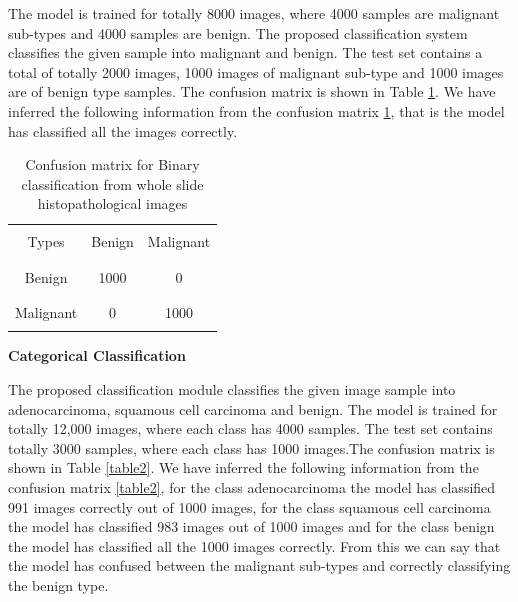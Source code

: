 \documentclass[conference]{IEEEtran}
\begin{document}
The model is trained for totally 8000 images, where 4000 samples are malignant sub-types and 4000 samples are benign. The proposed classification system classifies the given sample into malignant and benign. The test set contains a total of totally 2000 images, 1000 images of malignant sub-type and 1000 images are of benign type samples. The confusion matrix is shown in Table \ref{table1}. We have inferred the following information from the confusion matrix \ref{table1}, that is the model has classified all the images correctly.
\begin{table}
\begin{center}
\begin{tabular}[scale=2.0]{ | c |c  |c  | }
  \hline        
  &  &\\
  Types  & Benign & Malignant  \\
  & & \\
   \hline
   &  & \\
  Benign & 1000  &  0   \\ 
  & & \\
  \hline
  &  & \\
  Malignant  & 0 &    1000   \\
  & & \\
  \hline  
\end{tabular}
\caption{Confusion matrix for Binary classification from whole slide histopathological images}
\label{table1}
\end{center}
\end{table}
\newpage






\textbf{Categorical Classification}
%


The proposed classification module classifies the given image sample into adenocarcinoma, squamous cell carcinoma and benign. The model is trained for totally 12,000 images, where each class has 4000 samples. The test set contains totally 3000 samples, where each class has 1000 images.The confusion matrix is shown in Table \ref{table2}. We have inferred the following information from the confusion matrix \ref{table2}, for the class adenocarcinoma the model has classified 991 images correctly out of 1000 images, for the class squamous cell carcinoma the model has classified 983 images out of 1000 images and for the class benign the model has classified all the 1000 images correctly. From this we can say that the model has confused between the malignant sub-types and correctly classifying the benign type.
\end{document}
